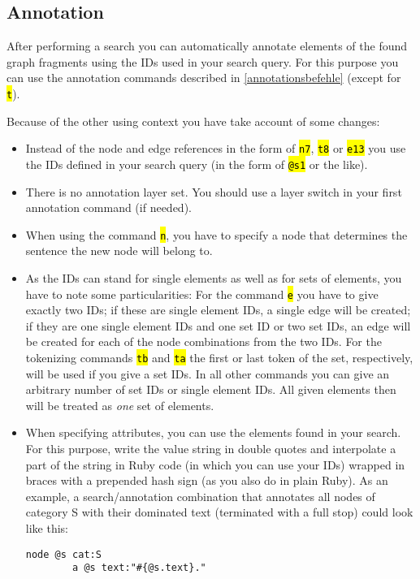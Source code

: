 \documentclass[12pt]{scrartcl}
\newcommand{\code}[1]{\hl{\texttt{#1}}}
\begin{document}
\subsection{Annotation}\label{query-annotation}

After performing a search you can automatically annotate elements of the found graph fragments using the IDs used in your search query.
For this purpose you can use the annotation commands described in \ref{annotationsbefehle} (except for \code{t}).

Because of the other using context you have take account of some changes:
\begin{itemize}
	\item Instead of the node and edge references in the form of \code{n7}, \code{t8} or \code{e13} you use the IDs defined in your search query (in the form of \code{@s1} or the like).
	\item There is no annotation layer set. You should use a layer switch in your first annotation command (if needed).
	\item When using the command \code{n}, you have to specify a node that determines the sentence the new node will belong to.
	\item As the IDs can stand for single elements as well as for sets of elements, you have to note some particularities: For the command \code{e} you have to give exactly two IDs; if these are single element IDs, a single edge will be created; if they are one single element IDs and one set ID or two set IDs, an edge will be created for each of the node combinations from the two IDs. For the tokenizing commands \code{tb} and \code{ta} the first or last token of the set, respectively, will be used if you give a set IDs. In all other commands you can give an arbitrary number of set IDs or single element IDs. All given elements then will be treated as \textit{one} set of elements.
	\item When specifying attributes, you can use the elements found in your search. For this purpose, write the value string in double quotes and interpolate a part of the string in Ruby code (in which you can use your IDs) wrapped in braces with a prepended hash sign (as you also do in plain Ruby). As an example, a search/annotation combination that annotates all nodes of category S with their dominated text (terminated with a full stop) could look like this:
	\begin{lstlisting}[gobble=8]
		node @s cat:S
		a @s text:"#{@s.text}."
	\end{lstlisting}
\end{itemize}
\end{document}
